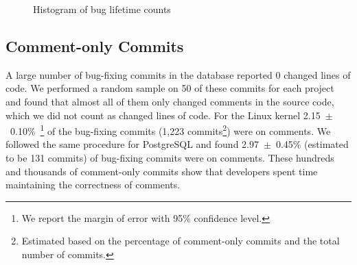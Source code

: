 \begin{figure}[tbh]
\centering
{}
\caption{Histogram of bug lifetime counts}
\label{fig-bug-lifetime} %
\end{figure}

\subsection{Comment-only Commits}
\label{sec-comment-only}
A large number of bug-fixing commits in the database
reported 0 changed lines of code. We performed a random sample on 50 of these
commits for each project and found that almost all of them only changed comments in the
source code, which we did not count as changed lines of code. For the Linux kernel 
2.15~$\pm$~0.10\%~\footnote{We report
the margin of error with 95\% confidence level.} 
of the bug-fixing
commits (1,223 commits\footnote{Estimated based on the percentage of comment-only
commits and the total number of commits.}) were on comments. We followed the same procedure for
PostgreSQL and found 2.97~$\pm$~0.45\% (estimated to be 131 commits) of bug-fixing commits were on
comments.
These hundreds and thousands of comment-only commits show that developers spent time maintaining
the correctness of comments.

